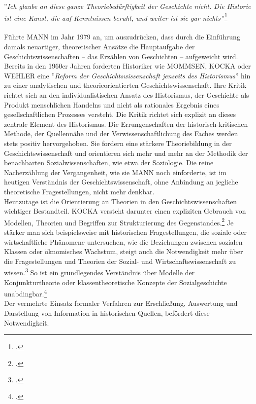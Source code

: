 \documentclass[12pt,a4paper]{article}
\begin{document}
''\textit{Ich glaube an diese ganze Theoriebedürftigkeit der Geschichte nicht. Die Historie ist eine Kunst, die auf Kenntnissen beruht, und weiter ist sie gar nichts'}'\footcite[][S.53]{mann1979pladoyer}
\\
\\
Führte MANN im Jahr 1979 an, um auszudrücken, dass durch die Einführung damals neuartiger, theoretischer Ansätze die Hauptaufgabe der Geschichtswissenschaften --  das Erzählen von Geschichten -- aufgeweicht wird. Bereits in den 1960er Jahren forderten Historiker wie MOMMSEN, KOCKA oder WEHLER eine ''\textit{Reform der Geschichtswissenschaft jenseits des Historismus}'' hin zu einer analytischen und theorieorientierten Geschichtswissenschaft. Ihre Kritik richtet sich an den individualistischen Ansatz des Historismus, der Geschichte als Produkt menschlichen Handelns und nicht als rationales Ergebnis eines gesellschaftlichen Prozesses versteht. Die Kritik richtet sich explizit an dieses zentrale Element des Historismus. Die Errungenschaften der historisch-kritischen Methode, der Quellennähe und der Verwissenschaftlichung des Faches werden stets positiv hervorgehoben. Sie fordern eine stärkere Theoriebildung in der Geschichtswissenschaft und orientieren sich mehr und mehr an der Methodik der benachbarten Sozialwissenschaften, wie etwa der Soziologie. Die reine Nacherzählung der Vergangenheit, wie sie MANN noch einforderte, ist im heutigen Verständnis der Geschichtswissenschaft, ohne Anbindung an jegliche theoretische Fragestellungen, nicht mehr denkbar.
\\
Heutzutage ist die Orientierung an Theorien in den Geschichtswissenschaften wichtiger Bestandteil. KOCKA versteht darunter einen expliziten Gebrauch von Modellen, Theorien und Begriffen zur Strukturierung des Gegenstandes.\footcite[][S.2]{magerski2009schreibt} Je stärker man sich beispielsweise mit historischen Fragestellungen, die soziale oder wirtschaftliche Phänomene untersuchen, wie die Beziehungen zwischen sozialen Klassen oder öknomisches Wachstum, steigt auch die Notwendigkeit mehr über die Fragestellungen und Theorien der Sozial- und Wirtschaftswissenschaft zu wissen.\footcite[][S.6-8]{kocka1982theorien} So ist ein grundlegendes Verständnis über Modelle der Konjunkturtheorie oder klassentheoretische Konzepte der Sozialgeschichte unabdingbar.\footcite[][S.1]{sokollgrundlagen}
\\
Der vermehrte Einsatz formaler Verfahren zur Erschließung, Auswertung und Darstellung von Information in historischen Quellen, befördert diese Notwendigkeit.
\end{document}
